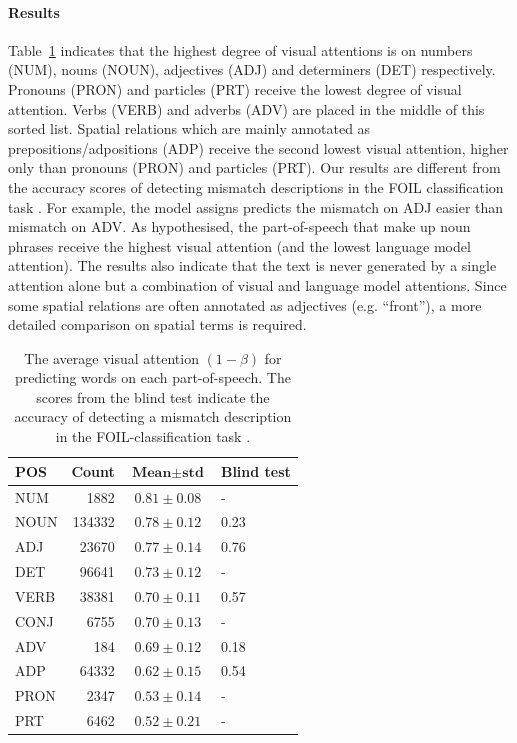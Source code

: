 \paragraph{Results}
Table~\ref{sivl2018:tab:pos} indicates that the highest degree of visual attentions is
on numbers (NUM), nouns (NOUN), adjectives (ADJ) and determiners (DET)
respectively. Pronouns (PRON) and particles (PRT) receive the lowest degree of
visual attention. Verbs (VERB) and adverbs (ADV) are placed in the middle of
this sorted list. Spatial relations which are mainly annotated as
prepositions/adpositions (ADP) receive the second lowest visual attention,
higher only than pronouns (PRON) and particles (PRT). Our results are
different from the accuracy scores of detecting mismatch descriptions in the
FOIL classification task \cite{shekhar2017vision}.
For example, the model assigns predicts the mismatch on ADJ easier than
mismatch on ADV. As hypothesised, the part-of-speech that make up noun phrases
receive the highest visual attention (and the lowest language model attention).
The results also indicate that the text is never generated by a single
attention alone but a combination of visual and language model attentions.
Since some spatial relations are often annotated as adjectives (e.g.
``front''), a more detailed comparison on spatial terms is required.

\begin{table} %
    \centering
    \begin{tabular}{|l|r|c|l|}
      \hline
        \textbf{POS} & \textbf{Count} & $\textbf{Mean} \pm \textbf{std}$ & \textbf{Blind test} %
        \\
        \hline
        NUM 	& 1882  	& $0.81 \pm 0.08$ & -
        \\
        NOUN	& 134332	& $0.78 \pm 0.12$ & 0.23
        \\
        ADJ 	& 23670 	& $0.77 \pm 0.14$ & 0.76
        \\
        DET 	& 96641 	& $0.73 \pm 0.12$ & -
        \\
        VERB	& 38381 	& $0.70 \pm 0.11$ & 0.57
        \\
        CONJ	& 6755  	& $0.70 \pm 0.13$ & -
        \\
        ADV 	& 184   	& $0.69 \pm 0.12$ & 0.18
        \\
        ADP 	& 64332 	& $0.62 \pm 0.15$ & 0.54
        \\
        PRON	& 2347  	& $0.53 \pm 0.14$ & -
        \\
        PRT 	& 6462  	& $0.52 \pm 0.21$ & -
      \\
      \hline
    \end{tabular}
	\vspace{0.5em}
    \caption{The average visual attention $(1-\beta)$ for predicting words on
	each part-of-speech. The scores from the blind test indicate the accuracy
	of detecting a mismatch description in the FOIL-classification task
	\cite{shekhar2017vision}.}\label{sivl2018:tab:pos}
\end{table}

